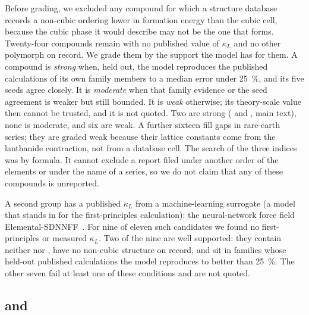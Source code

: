 \documentclass[preprint, 12pt]{elsarticle}
\begin{document}
Before grading, we excluded any compound for which a structure database records a non-cubic
ordering lower in formation energy than the cubic cell, because the cubic phase it would describe may
not be the one that forms. Twenty-four compounds remain with no published value of $\kappa_L$ and no
other polymorph on record. We grade them by the support the model has for them. A compound is
\emph{strong} when, held out, the model reproduces the published calculations of its own family
members to a median error under \SI{25}{\percent}, and its five seeds agree closely. It is
\emph{moderate} when that family evidence or the seed agreement is weaker but still bounded. It is
\emph{weak} otherwise; its theory-scale value then cannot be trusted, and it is not quoted. Two are
strong ( and , main text), none is moderate, and six are weak. A further
sixteen fill gaps in rare-earth series; they are graded weak because their lattice constants come
from the lanthanide contraction, not from a database cell. The search of the three indices was by formula. It cannot exclude a report filed
under another order of the elements or under the name of a series, so we do not claim that any of
these compounds is unreported.

A second group has a published $\kappa_L$ from a machine-learning surrogate (a model that stands in
for the first-principles calculation): the neural-network force field
Elemental-SDNNFF~\cite{rodriguez2023millionsca}. For nine of eleven such candidates we found no first-principles or measured $\kappa_L$. Two of the nine are well supported: they contain neither
 nor , have no non-cubic structure on record, and sit in families whose held-out
published calculations the model reproduces to better than \SI{25}{\percent}. The other seven fail
at least one of these conditions and are not quoted.

\subsection*{ and }
\end{document}
